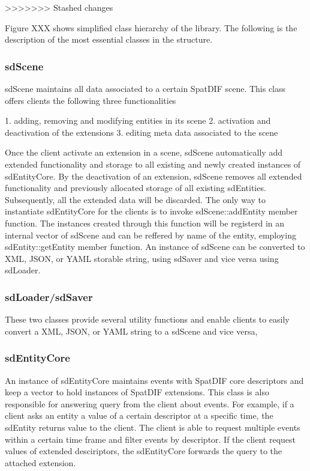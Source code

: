 \documentclass{article}
\begin{document}
>>>>>>> Stashed changes

Figure XXX shows simplified class hierarchy of the library. The following is the description of the most essential classes in the structure.

\subsubsection{sdScene}

sdScene maintains all data associated to a certain SpatDIF scene. This class offers clients the following three functionalities

1. adding, removing and modifying entities in its scene
2. activation and deactivation of the extensions
3. editing meta data associated to the scene

Once the client activate an extension in a scene, sdScene automatically add extended functionality and storage to all existing and newly created instances of sdEntityCore. By the deactivation of an extension, sdScene removes all extended functionality and previously allocated storage of all existing sdEntities. Subsequently, all the extended data will be discarded.
The only way to instantiate sdEntityCore for the clients is to invoke sdScene::addEntity member function. The instances created through this function will be registerd in an internal vector
of sdScene and  can be reffered by name of the entity, employing sdEntity::getEntity member function. An instance of sdScene can be converted to XML, JSON, or YAML storable string, using sdSaver and vice versa using sdLoader.

\subsubsection{sdLoader/sdSaver}
These two classes provide several utility functions and enable clients to easily convert a XML, JSON, or YAML string to a sdScene and vice versa,

\subsubsection{sdEntityCore}
An instance of sdEntityCore maintains events with SpatDIF core descriptors and keep a vector to hold instances of SpatDIF extensions. This class is also responsible for answering query from the client about events. For example, if a client asks an entity a value of a certain descriptor at a specific time, the sdEntity returns value to the client. The client is able to request multiple events within a certain time frame and filter events by descriptor. If the client request values of extended desciriptors, the sdEntityCore forwards the query to the attached extension.
\end{document}
